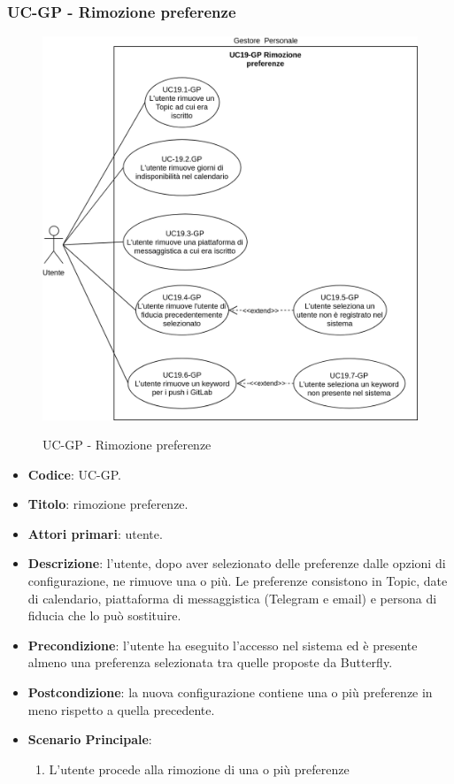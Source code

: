 \subsubsection{UC\theuccount-GP - Rimozione preferenze}
		\begin{figure}[H]
			\centering
				\includegraphics[width=\textwidth]{img/casi_d'uso/UC19.png}\\
			\caption{UC\theuccount-GP - Rimozione preferenze}
		\end{figure}
	\begin{itemize}
		\item \textbf{Codice}: UC\theuccount-GP.
		\item \textbf{Titolo}: rimozione preferenze.
		\item \textbf{Attori primari}: utente.
		\item \textbf{Descrizione}: l’utente, dopo aver selezionato delle preferenze dalle opzioni di configurazione, ne rimuove una o più. Le preferenze consistono in Topic, date di calendario, piattaforma di messaggistica (Telegram e email) e persona di fiducia che lo può sostituire.
		\item \textbf{Precondizione}: l’utente ha eseguito l'accesso nel sistema ed è presente almeno	una preferenza selezionata tra quelle proposte da Butterfly.
		\item \textbf{Postcondizione}: la nuova configurazione contiene una o più preferenze in meno rispetto	a quella precedente.
		\item \textbf{Scenario Principale}:
		\begin{enumerate}
			\item L'utente procede alla rimozione di una o più preferenze
		\end{enumerate}
	\end{itemize}

